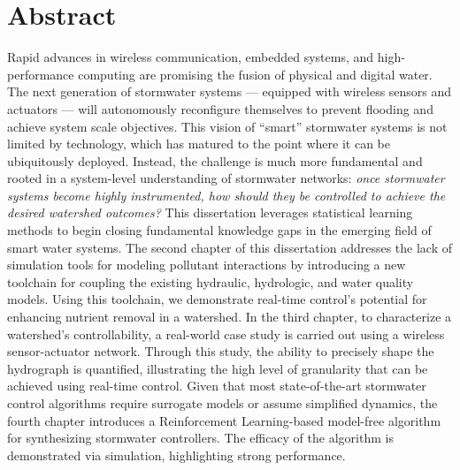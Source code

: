 \begingroup
\let\clearpage\relax
\let\cleardoublepage\relax
\let\cleardoublepage\relax

\chapter*{Abstract}
Rapid advances in wireless communication, embedded systems, and high-performance computing are promising the fusion of physical and digital water.
The next generation of stormwater systems --- equipped with wireless sensors and actuators --- will autonomously reconfigure themselves to prevent  flooding and achieve system scale objectives.
This vision of ``smart'' stormwater systems is not limited by technology, which has matured to the point where it can be ubiquitously deployed.
Instead, the challenge is much more fundamental and rooted in a system-level understanding of stormwater networks: \textit{once stormwater systems become highly instrumented, how should they be controlled to achieve the desired watershed outcomes?} This dissertation leverages statistical learning methods to begin closing fundamental knowledge gaps in the emerging field of smart water systems.
The second chapter of this dissertation addresses the lack of simulation tools for modeling pollutant interactions by introducing a new toolchain for coupling the existing hydraulic, hydrologic, and water quality models.
Using this toolchain, we demonstrate real-time control's potential for enhancing nutrient removal in a watershed.
In the third chapter, to characterize a watershed's controllability, a real-world case study is carried out using a wireless sensor-actuator network.
Through this study, the ability to precisely shape the hydrograph is quantified, illustrating the high level of granularity that can be achieved using real-time control. 
Given that most state-of-the-art stormwater control algorithms require surrogate models or assume simplified dynamics, the fourth chapter introduces a Reinforcement Learning-based model-free algorithm for synthesizing stormwater controllers.
The efficacy of the algorithm is demonstrated via simulation, highlighting strong performance.
